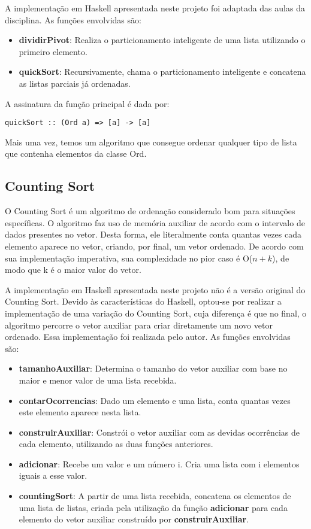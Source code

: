 \documentclass[12pt,a4paper]{article}
\begin{document}
A implementação em Haskell apresentada neste projeto foi adaptada das aulas da disciplina. As funções envolvidas são:

\begin{itemize}
\item \textbf{dividirPivot}: Realiza o particionamento inteligente de uma lista utilizando o primeiro elemento.
\item \textbf{quickSort}: Recursivamente, chama o particionamento inteligente e concatena as listas parciais já ordenadas.
\end{itemize}

A assinatura da função principal é dada por:

\begin{lstlisting}
quickSort :: (Ord a) => [a] -> [a]
\end{lstlisting}

Mais uma vez, temos um algoritmo que consegue ordenar qualquer tipo de lista que contenha elementos da classe Ord.

\subsection{Counting Sort}
O Counting Sort é um algoritmo de ordenação considerado bom para situações específicas. O algoritmo faz uso de memória auxiliar de acordo com o intervalo de dados presentes no vetor. Desta forma, ele literalmente conta quantas vezes cada elemento aparece no vetor, criando, por final, um vetor ordenado. De acordo com sua implementação imperativa, sua complexidade no pior caso é O($n+k$), de modo que k é o maior valor do vetor.

A implementação em Haskell apresentada neste projeto não é a versão original do Counting Sort. Devido às características do Haskell, optou-se por realizar a implementação de uma variação do Counting Sort, cuja diferença é que no final, o algoritmo percorre o vetor auxiliar para criar diretamente um novo vetor ordenado. Essa implementação foi realizada pelo autor. As funções envolvidas são:

\begin{itemize}
\item \textbf{tamanhoAuxiliar}: Determina o tamanho do vetor auxiliar com base no maior e menor valor de uma lista recebida.
\item \textbf{contarOcorrencias}: Dado um elemento e uma lista, conta quantas vezes este elemento aparece nesta lista.
\item \textbf{construirAuxiliar}: Constrói o vetor auxiliar com as devidas ocorrências de cada elemento, utilizando as duas funções anteriores.
\item \textbf{adicionar}: Recebe um valor e um número i. Cria uma lista com i elementos iguais a esse valor. 
\item \textbf{countingSort}: A partir de uma lista recebida, concatena os elementos de uma lista de listas, criada pela utilização da função \textbf{adicionar} para cada elemento do vetor auxiliar construído por \textbf{construirAuxiliar}.
\end{itemize}
\end{document}
